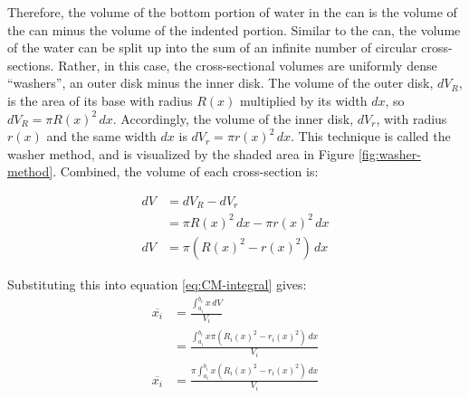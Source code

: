\documentclass[11pt]{article}
\begin{document}
    Therefore, the volume of the bottom portion of water in the can is the volume of the can minus the volume of the indented portion. Similar to the can, the volume of the water can be split up into the sum of an infinite number of circular cross-sections. Rather, in this case, the cross-sectional volumes are uniformly dense ``washers'', an outer disk minus the inner disk. The volume of the outer disk, $dV_R$, is the area of its base with radius $R(x)$ multiplied by its width $dx$, so $dV_R = \pi R(x)^2 \, dx$. Accordingly, the volume of the inner disk, $dV_r$, with radius $r(x)$ and the same width $dx$ is $dV_r = \pi r(x)^2 \, dx$. This technique is called the washer method, and is visualized by the shaded area in Figure \ref{fig:washer-method}. Combined, the volume of each cross-section is:

    \begin{minipage}{.5\linewidth}
        \footnotesize
        \begin{align*}
            dV &= dV_R - dV_r \\
            &= \pi R(x)^2 \, dx - \pi r(x)^2 \, dx \\
            dV &= \pi \left( R(x)^2 - r(x)^2 \right) \, dx
        \end{align*}
    \end{minipage}%
    \begin{minipage}{.5\linewidth}
        \vspace{20pt}
        Substituting this into equation \eqref{eq:CM-integral} gives:
        {\footnotesize\begin{align*}
            \overline{x_i} &= \frac{\int_{a_i}^{b_i} x \, dV}{V_i} \\
            &= \frac{\int_{a_i}^{b_i} x \pi \left( R_i(x)^2 - r_i(x)^2 \right) \, dx}{V_i} \\
            \overline{x_i} &= \frac{\pi \int_{a_i}^{b_i} x \left( R_i(x)^2 - r_i(x)^2 \right) \, dx}{V_i}
        \end{align*}}
    \end{minipage}
    \vspace{20pt}
\end{document}
